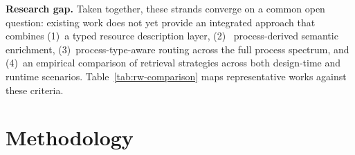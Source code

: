 \documentclass[10pt,twocolumn]{article}
\begin{document}
\textbf{Research gap.} Taken together, these strands converge on a common open question: existing work does not yet provide an integrated approach that combines (1)~a typed resource description layer, (2)~ process-derived semantic enrichment, (3)~process-type-aware routing across the full process spectrum, and (4)~an empirical comparison of retrieval strategies across both design-time and runtime scenarios. Table~\ref{tab:rw-comparison} maps representative works against these criteria.




\section{Methodology}
\label{sec:design}
\end{document}
